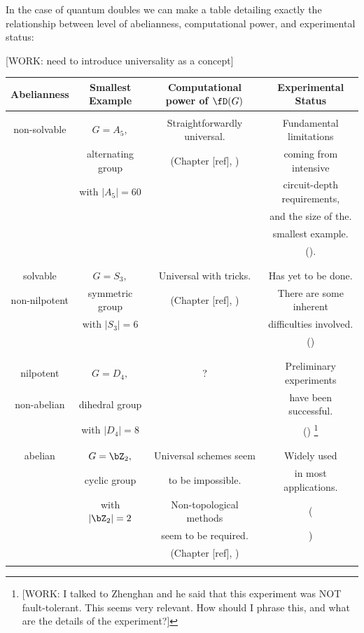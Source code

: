 In the case of quantum doubles we can make a table detailing exactly the relationship between level of abelianness, computational power, and experimental status:

[WORK: need to introduce universality as a concept]

\begin{center}
\begin{tabular}{|| c | c | c | c ||} 

\hline
Abelianness & Smallest Example& Computational power of $\fD(G)$& Experimental Status \\ [0.5ex] 
 \hline\hline
  &  & &\\ 
 non-solvable & $G=A_5,$ & Straightforwardly universal.& Fundamental limitations\\
  & alternating group & (Chapter [ref], \cite{mochon2003anyons})& coming from intensive\\ 
  & with $|A_5|=60$ & & circuit-depth requirements,\\ 
  &  & & and the size of the.\\ 
  &  & & smallest example.\\ 
  &  & & (\cite{bravyi2022adaptive}).\\ 
  &  & &\\ 
 \hline
  &  & &\\ 
 solvable& $G=S_3,$ & Universal with tricks. & Has yet to be done.\\
 non-nilpotent& symmetric group& (Chapter [ref], \cite{mochon2004anyon}) & There are some inherent \\ 
 & with $|S_3|=6$ & & difficulties involved.\\ 
  &  & & (\cite{tantivasadakarn2023hierarchy})\\ 
  &  & &\\ 
 \hline  &  & &\\ 
 nilpotent& $G=D_4,$ & ? & Preliminary experiments \\
 non-abelian& dihedral group & & have been successful.  \\ 
 & with $|D_4|=8$ & & (\cite{iqbal2024non}) \footnote{[WORK: I talked to Zhenghan and he said that this experiment was NOT fault-tolerant. This seems very relevant. How should I phrase this, and what are the details of the experiment?]}   \\ 
  &  & &\\ 
 \hline
  &  & &\\ 
 abelian & $G=\bZ_2,$ & Universal schemes seem& Widely used\\ 
  & cyclic group & to be impossible.& in most applications. \\ 
  &with $|\bZ_2|=2$ &  Non-topological methods& (\cite{bravyi2024high, hong2024entangling}\\ 
  &  & seem to be required.& \cite{balewski2024engineering, google2023suppressing})\\ 
  &  & (Chapter [ref], \cite{bravyi2013classification, eastin2009restrictions}) &\\ 
  &  & &\\ 
 \hline
\end{tabular}
\end{center}

